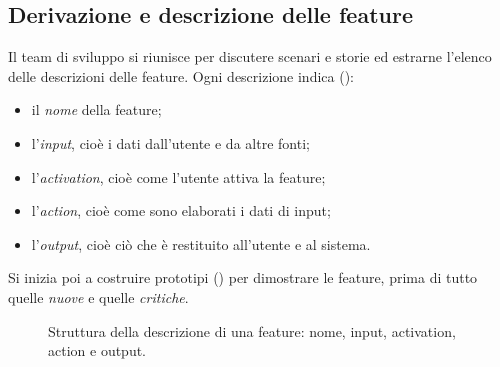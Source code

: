 \subsection*{Derivazione e descrizione delle feature}

Il team di sviluppo si riunisce per discutere scenari e storie ed estrarne l'elenco delle descrizioni delle feature.
Ogni descrizione indica ():
\begin{itemize}
  \item il \emph{nome} della feature;
  \item l'\emph{input}, cioè i dati dall'utente e da altre fonti;
  \item l'\emph{activation}, cioè come l'utente attiva la feature;
  \item l'\emph{action}, cioè come sono elaborati i dati di input;
  \item l'\emph{output}, cioè ciò che è restituito all'utente e al sistema.
\end{itemize}
Si inizia poi a costruire prototipi () per dimostrare le feature, prima di tutto quelle
\emph{nuove} e quelle \emph{critiche}.

\begin{figure}[ht]
\centering
{}
\caption{Struttura della descrizione di una feature: nome, input, activation, action e output.}
\label{fig:feature-descrizione}
\end{figure}

